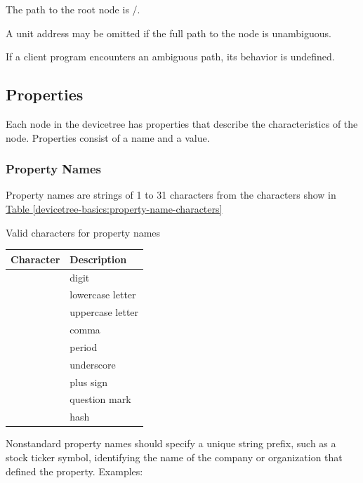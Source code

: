 \documentclass[a4paper,10pt,oneside]{sphinxmanual}
\begin{document}
The path to the root node is /.

A unit address may be omitted if the full path to the node is
unambiguous.

If a client program encounters an ambiguous path, its behavior is
undefined.


\subsection{Properties}
\label{devicetree-basics:properties}
Each node in the devicetree has properties that describe the
characteristics of the node. Properties consist of a name and a value.


\subsubsection{Property Names}
\label{devicetree-basics:property-names}
Property names are strings of 1 to 31 characters from the characters show in
\hyperref[devicetree-basics:property-name-characters]{Table \ref{devicetree-basics:property-name-characters}}


\begin{threeparttable}
\capstart\caption{Valid characters for property names}\label{devicetree-basics:property-name-characters}\label{devicetree-basics:id6}
\begin{tabulary}{\linewidth}{| c p{8cm} |}
\hline
\textsf{\relax 
Character
} & \textsf{\relax 
Description
}\\
\hline
{}
 & 
digit
\\
\hline
{}
 & 
lowercase letter
\\
\hline
{}
 & 
uppercase letter
\\
\hline
\code{,}
 & 
comma
\\
\hline
{}
 & 
period
\\
\hline
\code{\_}
 & 
underscore
\\
\hline
\code{+}
 & 
plus sign
\\
\hline
{}
 & 
question mark
\\
\hline
\code{\#}
 & 
hash
\\
\hline\end{tabulary}

\end{threeparttable}


Nonstandard property names should specify a unique string prefix, such
as a stock ticker symbol, identifying the name of the company or
organization that defined the property. Examples:
\begin{quote}

\begin{DUlineblock}{0em}
\item[] 
\item[] 
\item[] 
\end{DUlineblock}
\end{quote}
\end{document}

